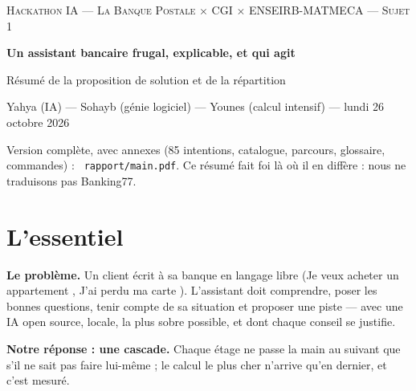 \documentclass[11pt,a4paper]{article}
\DeclareRobustCommand{\f}[1]{{\texttt{\small
  \renewcommand{\_}{\char`\_\allowbreak}#1}}}
\begin{document}
\begin{center}
{\small\scshape\color{darkgray} Hackathon IA --- La Banque Postale $\times$ CGI $\times$
ENSEIRB-MATMECA --- Sujet 1\par}
\vspace{0.25cm}
{\LARGE\bfseries\color{mainblue} Un assistant bancaire frugal, explicable, et qui agit\par}
\vspace{0.15cm}
{\large Résumé de la proposition de solution et de la répartition\par}
\vspace{0.2cm}
{\small Yahya (IA) --- Sohayb (génie logiciel) --- Younes (calcul intensif) --- lundi 26 octobre
2026\par}
{\footnotesize\color{darkgray} Version complète, avec annexes (85 intentions, catalogue, parcours,
glossaire, commandes) : \f{rapport/main.pdf}. Ce résumé fait foi là où il en diffère :
nous ne traduisons pas Banking77.\par}
\end{center}
\vspace{-0.2cm}

\section*{L'essentiel}

\textbf{Le problème.} Un client écrit à sa banque en langage libre (\og Je veux acheter un
appartement \fg, \og J'ai perdu ma carte \fg). L'assistant doit comprendre, poser les bonnes
questions, tenir compte de sa situation et proposer une piste --- avec une IA open source, locale,
la plus sobre possible, et dont chaque conseil se justifie.

\textbf{Notre réponse : une cascade.} Chaque étage ne passe la main au suivant que s'il ne sait pas
faire lui-même ; le calcul le plus cher n'arrive qu'en dernier, et c'est mesuré.
\end{document}
